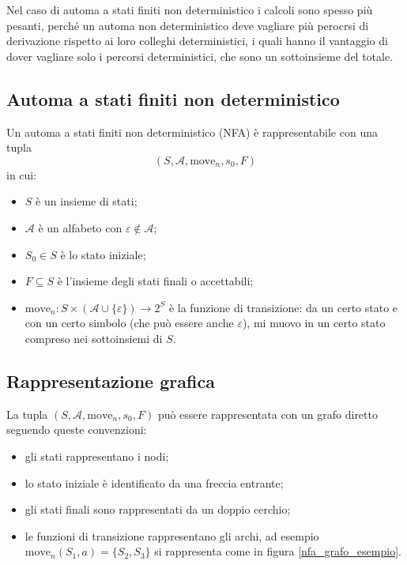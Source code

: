 \documentclass[class=book, crop=false, oneside, 12pt]{standalone}
\begin{document}
Nel caso di automa a stati finiti non deterministico i calcoli sono spesso più pesanti, perché un automa non deterministico deve vagliare più perocrsi di derivazione rispetto ai loro colleghi deterministici, i quali hanno il vantaggio di dover vagliare solo i percorsi deterministici, che sono un sottoinsieme del totale.

\subsection{Automa a stati finiti non deterministico}
Un automa a stati finiti non deterministico (NFA) è rappresentabile con una tupla
\begin{equation*}
    (S, \mathcal{A}, \textrm{move}_n, s_0, F)
    \label{nfa_tupla}
\end{equation*}
in cui:
\begin{itemize}
    \item \(S\) è un insieme di stati;
    \item \(\mathcal{A}\) è un alfabeto con \(\varepsilon \notin \mathcal{A}\);
    \item \(S_0 \in S\) è lo stato iniziale;
    \item \(F \subseteq S\) è l’insieme degli stati finali o accettabili;
    \item \(\textrm{move}_n : S \times (\mathcal{A} \cup \{\varepsilon\}) \to 2^S\) è la funzione di transizione: da un certo stato e con un certo simbolo (che può essere anche \(\varepsilon\)), mi muovo in un certo stato compreso nei sottoinsiemi di \(S\).
\end{itemize}

\subsection{Rappresentazione grafica}
La tupla \((S, \mathcal{A}, \textrm{move}_n, s_0, F)\) può essere rappresentata con un grafo diretto seguendo queste convenzioni:
\begin{itemize}
    \item gli stati rappresentano i nodi;
    \item lo stato iniziale è identificato da una freccia entrante;
    \item gli stati finali sono rappresentati da un doppio cerchio;
    \item le funzioni di transizione rappresentano gli archi, ad esempio \(\textrm{move}_n(S_1, a) = \{S_2, S_3\}\) si rappresenta come in figura \ref{nfa_grafo_esempio}.
\end{itemize}
\end{document}
